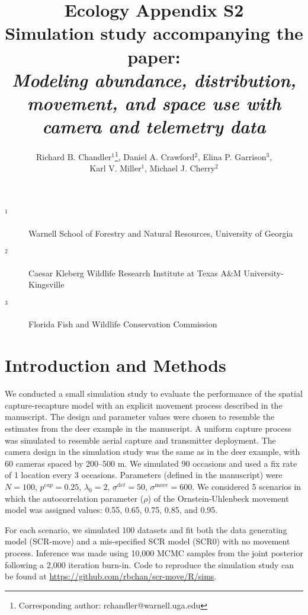 \documentclass[12pt]{article}
\title{Ecology Appendix S2 \\ Simulation study accompanying the paper: \\ \it Modeling abundance, distribution, movement, and space
  use with camera and telemetry data}
\author{Richard B. Chandler$^1$\footnote{Corresponding author: rchandler@warnell.uga.edu}, Daniel A. Crawford$^2$, Elina P. Garrison$^3$, \\
  Karl V. Miller$^1$, Michael J. Cherry$^2$}
\begin{document}
\maketitle

\vspace{12pt}

\begin{description}%
\item[$^1$] Warnell School of Forestry and Natural Resources, University of Georgia %
\item[$^2$] Caesar Kleberg Wildlife Research Institute at Texas A\&M University-Kingsville %
\item[$^3$] Florida Fish and Wildlife Conservation Commission %
\end{description}

\clearpage

\section*{Introduction and Methods}

We conducted a small simulation study to evaluate the performance of the
spatial capture-recapture model with an explicit movement process
described in the manuscript.
The design and parameter values were chosen to resemble the estimates
from the deer example in the manuscript. A uniform capture process was
simulated to resemble aerial capture and transmitter
deployment. The camera design in the simulation study was the same as
in the deer example, with 60 cameras spaced by 200--500 m. We simulated
90 occasions and used a fix rate of 1 location every 3
occasions. Parameters (defined in the manuscript) were $N=100$,
$p^{\mathrm cap}=0.25$, $\lambda_0=2$, $\sigma^{\mathrm det}=50$,
$\sigma^{\mathrm move}=600$. We 
considered 5 scenarios in which the autocorrelation parameter ($\rho$)
of the Ornstein-Uhlenbeck movement model was assigned values: 0.55,
0.65, 0.75, 0.85, and 0.95. 

For each scenario, we simulated 100 datasets and fit both
the data generating model (SCR-move) and a mis-specified SCR model
(SCR0) with no movement process. Inference was made using 10,000 MCMC
samples from the joint posterior following a 2,000 iteration
burn-in. Code to reproduce the simulation study can be found at
\url{https://github.com/rbchan/scr-move/R/sims}.
\end{document}
